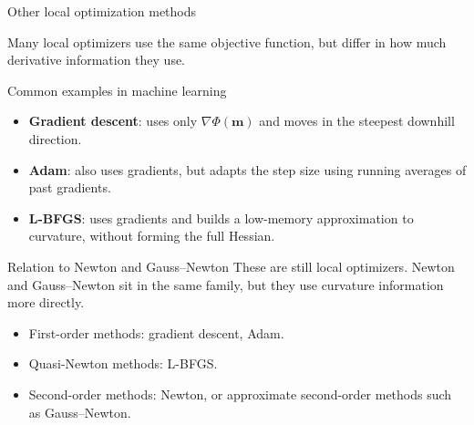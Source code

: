 \documentclass[aspectratio=169]{beamer}
\renewcommand{\vec}[1]{\mathbf{#1}}
\newcommand{\mm}{ {\vec{m}} }
\begin{document}
\begin{frame}{Other local optimization methods}
\small

Many local optimizers use the same objective function, but differ in how much derivative information they use.

\begin{block}{Common examples in machine learning}
\begin{itemize}
    \item[--] \textbf{Gradient descent}: uses only $\nabla\Phi(\mm)$ and moves in the steepest downhill direction.
    \item[--] \textbf{Adam}: also uses gradients, but adapts the step size using running averages of past gradients.
    \item[--] \textbf{L-BFGS}: uses gradients and builds a low-memory approximation to curvature, without forming the full Hessian.
\end{itemize}
\end{block}

\begin{alertblock}{Relation to Newton and Gauss--Newton}
These are still \alert{local} optimizers. Newton and Gauss--Newton sit in the same family, but they use curvature information more directly.
\end{alertblock}

\begin{itemize}
    \item[--] First-order methods: gradient descent, Adam.
    \item[--] Quasi-Newton methods: L-BFGS.
    \item[--] Second-order methods: Newton, or approximate second-order methods such as Gauss--Newton.
\end{itemize}
\end{frame}
\end{document}
